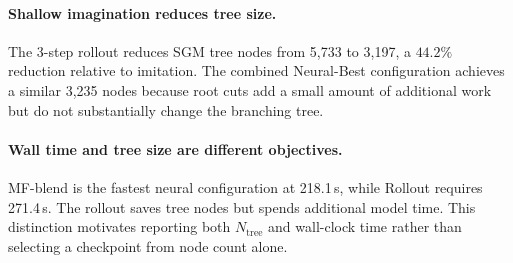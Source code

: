 \documentclass{article}
\begin{document}
\begin{table}[t]
\caption{Medium tier: $500\times1000$ Set Cover, 10 instances, 300\,s limit. SGM uses shifts $\delta_N=10$ and $\delta_T=1$. ``At limit'' is a partial tree-node count and is not comparable with a completed-tree count. The gap is relative to the best feasible incumbent observed within the same budget, not an optimality certificate.}
\label{tab:main}
\centering
{}
\end{table}

\paragraph{Shallow imagination reduces tree size.}
The 3-step rollout reduces SGM tree nodes from 5,733 to 3,197, a $44.2\%$ reduction relative to imitation. The combined Neural-Best configuration achieves a similar 3,235 nodes because root cuts add a small amount of additional work but do not substantially change the branching tree.

\paragraph{Wall time and tree size are different objectives.}
MF-blend is the fastest neural configuration at 218.1\,s, while Rollout requires 271.4\,s. The rollout saves tree nodes but spends additional model time. This distinction motivates reporting both $N_{\mathrm{tree}}$ and wall-clock time rather than selecting a checkpoint from node count alone.
\end{document}
